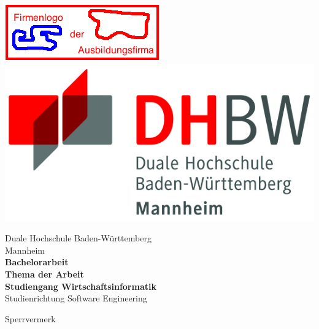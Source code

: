 \begin{titlepage}
\begin{minipage}{\textwidth}
		\vspace{-2cm}
		\noindent \includegraphics[scale=0.71]{img/firmenlogo.jpg} \hfill   \includegraphics{img/logo.jpg}
\end{minipage}
\vspace{1em}
\sffamily
\begin{center}
	\textsf{\large{}Duale Hochschule Baden-W\"urttemberg\\[1.5mm] Mannheim}\\[2em]
	\textsf{\textbf{\Large{}Bachelorarbeit}}\\[3mm]
	\textsf{\textbf{Thema der Arbeit}} \\[1.5cm]
	\textsf{\textbf{\Large{}Studiengang Wirtschaftsinformatik}\\[3mm] \textsf{Studienrichtung Software Engineering}}
	
	\vspace{3em}
	\textsf{\Large{Sperrvermerk}}
\vfill

\begin{minipage}{\textwidth}


\end{minipage}
\end{center}
\end{titlepage}
